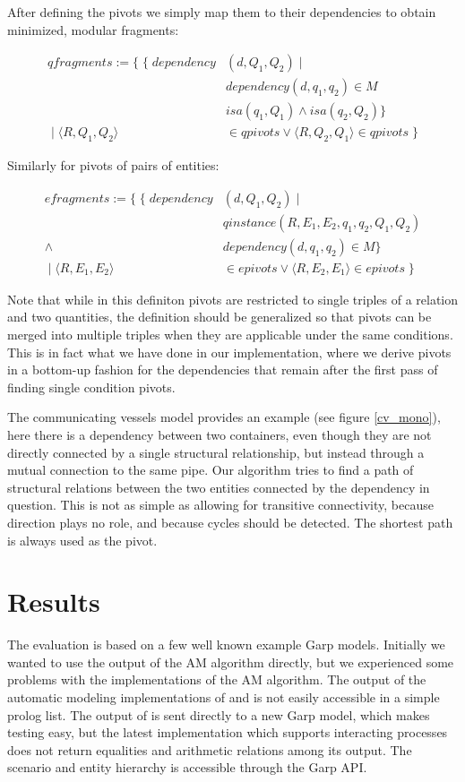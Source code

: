 \documentclass{article} %
\begin{document}
After defining the pivots we simply map them to their dependencies to obtain
minimized, modular fragments:

\begin{align*}
qfragments := \{ \; \{ \; dependency&(d, Q_1, Q_2) \; | \; \\
		& dependency(d, q_1, q_2)  \in M \\
		& isa(q_1, Q_1) \land isa(q_2, Q_2) \} \\
	\; | \; \langle R, Q_1, Q_2 \rangle &\in qpivots \lor 
	\langle R, Q_2, Q_1 \rangle \in qpivots \; \}
\end{align*}

Similarly for pivots of pairs of entities:

\begin{align*}
efragments := \{ \; \{ \; dependency&(d, Q_1, Q_2) \; | \; \\
		& qinstance(R, E_1, E_2, q_1, q_2, Q_1, Q_2) \\
		\land \; & dependency(d, q_1, q_2)  \in M \} \\
	\; | \; \langle R, E_1, E_2 \rangle &\in epivots \lor 
	\langle R, E_2, E_1 \rangle \in epivots \; \}
\end{align*}

Note that while in this definiton pivots are restricted to single triples of a
relation and two quantities, the definition should be generalized so that
pivots can be merged into multiple triples when they are applicable under the
same conditions. This is in fact what we have done in our implementation,
where we derive pivots in a bottom-up fashion for the dependencies that remain
after the first pass of finding single condition pivots.

The communicating vessels model provides an example (see figure \ref{cv_mono}),
here there is a dependency between two containers, even though they are not
directly connected by a single structural relationship, but instead through
a mutual connection to the same pipe. Our algorithm tries to find a path of
structural relations between the two entities connected by the dependency in
question. This is not as simple as allowing for transitive connectivity,
because direction plays no role, and because cycles should be detected. The
shortest path is always used as the pivot.

\section{Results}
\label{sec:results}
The evaluation is based on a few well known example Garp models. Initially
we wanted to use the output of the AM algorithm directly, but we experienced
some problems with the implementations of the AM algorithm.  The output of the
automatic modeling implementations of \cite{buisman} and
\cite{vanweelden} is not easily accessible in a simple prolog list. The output
of \cite{buisman} is sent directly to a new Garp model, which makes testing
easy, but the latest implementation \cite{vanweelden} which supports
interacting processes does not return equalities and arithmetic relations among
its output. The scenario and entity hierarchy is accessible through the Garp
API.
\end{document}
